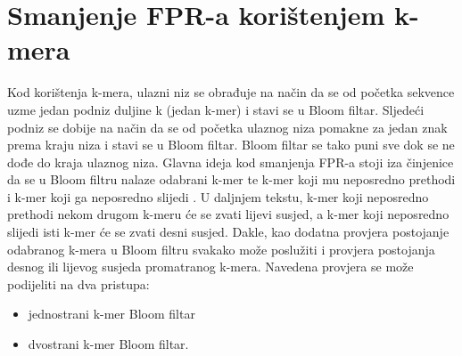 \documentclass[times, utf8, seminar, numeric]{fer}
\begin{document}
\chapter{Smanjenje FPR-a korištenjem k-mera}
Kod korištenja k-mera, ulazni niz se obrađuje na način da se od početka sekvence
uzme jedan podniz duljine k (jedan k-mer) i stavi se u Bloom filtar. Sljedeći
podniz se dobije na način da se od početka ulaznog niza pomakne za jedan znak
prema kraju niza i stavi se u Bloom filtar. Bloom filtar se tako puni sve dok se
ne dođe do kraja ulaznog niza.
Glavna ideja kod smanjenja FPR-a stoji iza činjenice da se u Bloom filtru nalaze
odabrani k-mer te k-mer koji mu neposredno prethodi i k-mer koji ga neposredno
slijedi \cite{kbf}. U daljnjem tekstu, k-mer koji neposredno prethodi nekom
drugom k-meru će se zvati lijevi susjed, a k-mer koji neposredno slijedi isti
k-mer će se zvati desni susjed. Dakle, kao dodatna provjera postojanje odabranog
k-mera u Bloom filtru svakako može poslužiti i provjera postojanja desnog ili
lijevog susjeda promatranog k-mera. Navedena provjera se može podijeliti na dva
pristupa:
\begin{itemize}
  \item{jednostrani k-mer Bloom filtar}
  \item{dvostrani k-mer Bloom filtar.}
\end{itemize}
\end{document}
